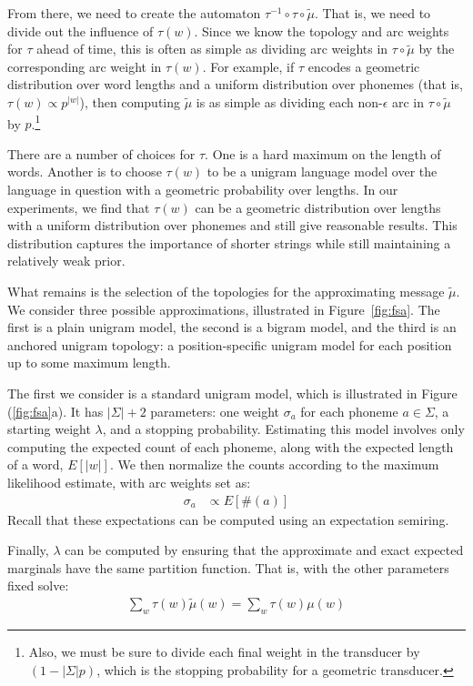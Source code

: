 \documentclass[11pt,a4paper]{article}
\begin{document}
From there, we need to create the automaton $\tau^{-1}
\circ\tau\circ\tilde\mu$. That is, we need to divide out the influence
of $\tau(w)$. Since we know the topology and arc weights for $\tau$
ahead of time, this is often as simple as dividing arc weights in
$\tau\circ\tilde\mu$ by the corresponding arc weight in $\tau(w)$.
For example, if $\tau$ encodes a geometric distribution over word
lengths and a uniform distribution over phonemes (that is, $\tau(w)
\propto {p^{|w|}}$), then computing $\tilde\mu$ is as simple as
dividing each non-$\epsilon$ arc in $\tau\circ\tilde\mu$ by $p$.\footnote{Also,
we must be sure to divide each final weight in the transducer
by $(1-|\Sigma| p)$, which is the stopping probability for a geometric
transducer.}

There are a number of choices for $\tau$. One is a hard maximum on
the length of words. Another is to choose $\tau(w)$ to be a unigram
language model over the language in question with a geometric
probability over lengths. In our experiments, we find that $\tau(w)$
can be a geometric distribution over lengths with a uniform
distribution over phonemes and still give reasonable results.
This distribution captures the importance of shorter strings while
still maintaining a relatively weak prior.

What remains is the selection of the topologies for the approximating
message $\tilde\mu$. We consider three possible approximations,
illustrated in Figure~\ref{fig:fsa}. The first is a plain unigram
model, the second is a bigram model, and the third is an anchored
unigram topology: a position-specific unigram model for each position
up to some maximum length.

The first we consider is a standard unigram model, which is illustrated
in Figure (\ref{fig:fsa}a). It has $|\Sigma|+2$ parameters: one
weight $\sigma_a$ for each phoneme $a \in \Sigma$, a starting
weight $\lambda$, and a stopping probability. Estimating this
model involves only computing the expected count of each phoneme,
along with the expected length of a word, $E[|w|]$. We then normalize
the counts according to the maximum likelihood estimate, with arc
weights set as:
\begin{equation*}
  \begin{split}
    \sigma_a &\propto E[\#(a)]
   \end{split}
 \end{equation*}
Recall that these expectations can be computed using an expectation semiring.

Finally, $\lambda$ can be computed by ensuring that the
approximate and exact expected marginals have the same partition
function. That is, with the other parameters fixed solve:
\begin{equation*}
  \begin{split}
    \sum_w \tau(w) \tilde\mu(w) = \sum_w \tau(w) \mu(w)
  \end{split}
\end{equation*}
\end{document}

